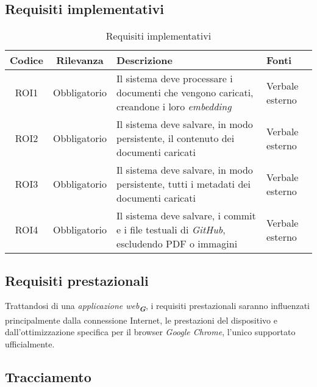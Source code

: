 \subsection{Requisiti implementativi}
\label{sec:Requisiti_implementativi}
\begin{table}[h!]
    \centering
    \renewcommand{\arraystretch}{1.6} %
    \begin{tabularx}{\textwidth}{|>{\centering\arraybackslash}c|>{\centering\arraybackslash}c|>{\centering\arraybackslash}X|>{\centering\arraybackslash}p{3cm}|} \hline
    \rowcolor[HTML]{FFD700} 
    \textbf{Codice} & \textbf{Rilevanza} & \textbf{Descrizione} & \textbf{Fonti} \\ \hline
    ROI1 & Obbligatorio & Il sistema deve processare i documenti che vengono caricati, creandone i loro \emph{embedding} & Verbale esterno\\ \hline
    ROI2 & Obbligatorio & Il sistema deve salvare, in modo persistente, il contenuto dei documenti caricati & Verbale esterno\\ \hline
    ROI3 & Obbligatorio & Il sistema deve salvare, in modo persistente, tutti i metadati dei documenti caricati & Verbale esterno\\ \hline
    ROI4 & Obbligatorio & Il sistema deve salvare, i commit e i file testuali di \emph{GitHub}, escludendo PDF o immagini & Verbale esterno\\ \hline
    \end{tabularx}
    \caption{Requisiti implementativi}
    \label{tab:Requisiti_implementativi}
\end{table}

\subsection{Requisiti prestazionali}
\label{sec:req_prestazionali}
Trattandosi di una \emph{applicazione web}\textsubscript{\textit{\textbf{G}}}, i requisiti prestazionali saranno influenzati principalmente dalla connessione Internet, 
le prestazioni del dispositivo e dall'ottimizzazione specifica per il browser \emph{Google Chrome}, l'unico supportato ufficialmente.

\newpage
\subsection{Tracciamento}
